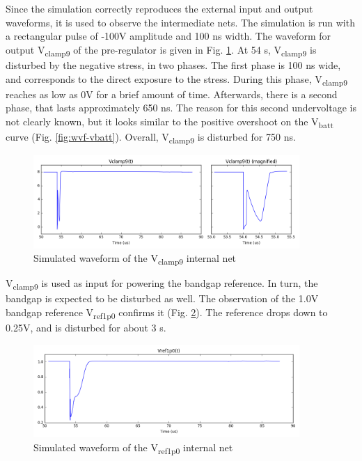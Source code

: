 Since the simulation correctly reproduces the external input and output waveforms, it is used to observe the intermediate nets.
The simulation is run with a rectangular pulse of -100V amplitude and 100 ns width.
The waveform for output V\textsubscript{clamp9} of the pre-regulator is given in Fig. \ref{fig:wvf-vclamp9}.
At 54 \textmugreek{}s,  V\textsubscript{clamp9} is disturbed by the negative stress, in two phases.
The first phase is 100 ns wide, and corresponds to the direct exposure to the stress.
During this phase, V\textsubscript{clamp9} reaches as low as 0V for a brief amount of time.
Afterwards, there is a second phase, that lasts approximately 650 ns.
The reason for this second undervoltage is not clearly known, but it looks similar to the positive overshoot on the  V\textsubscript{batt} curve (Fig. \ref{fig:wvf-vbatt}).
Overall, V\textsubscript{clamp9} is disturbed for 750 ns.

\begin{figure}[!htbp]
  \centering
  \includegraphics[width=0.9\textwidth]{src/3/figures/vclamp9.png}
  \caption{Simulated waveform of the V\textsubscript{clamp9} internal net}
  \label{fig:wvf-vclamp9}
\end{figure}

V\textsubscript{clamp9} is used as input for powering the bandgap reference.
In turn, the bandgap is expected to be disturbed as well.
The observation of the 1.0V bandgap reference V\textsubscript{ref1p0} confirms it (Fig. \ref{fig:wvf-v1p0}).
The reference drops down to 0.25V, and is disturbed for about 3 \textmugreek{}s.

\begin{figure}[!htbp]
  \centering
  \includegraphics[width=0.9\textwidth]{src/3/figures/v1p0.png}
  \caption{Simulated waveform of the V\textsubscript{ref1p0} internal net}
  \label{fig:wvf-v1p0}
\end{figure}


